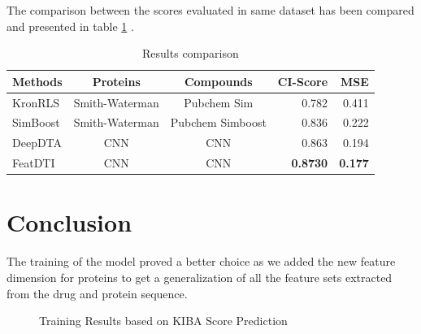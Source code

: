The comparison between the scores evaluated in same dataset has been compared and presented in table \ref{table:results_comparison} \cite{ozturk2018deepdta}. 

\begin{table}
    \centering
    \caption[]{Results comparison}
    \label{table:results_comparison}
    \begin{tabular}{|l|c|c|r|r|}
        \hline
        
        Methods & Proteins & Compounds & CI-Score & MSE \\ \hline
        KronRLS & Smith-Waterman & Pubchem Sim & 0.782 & 0.411 \\ \hline
        SimBoost & Smith-Waterman & Pubchem Simboost & 0.836 & 0.222 \\ \hline
        DeepDTA & CNN & CNN & 0.863 & 0.194 \\ \hline
        FeatDTI & CNN & CNN & \textbf{0.8730} & \textbf{0.177} \\ \hline
        
        \end{tabular}
\end{table}

\section{Conclusion}
The training of the model proved a better choice as we added the new feature dimension for proteins to get a generalization of all the feature sets extracted from the drug and protein sequence.

\begin{figure}[H]
    \caption{Training Results based on KIBA Score Prediction}
    \label{fig:pred_train}
\end{figure}


